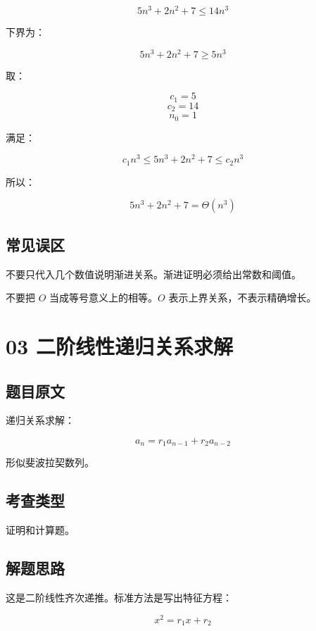 \documentclass[UTF8,zihao=-4]{ctexart}
\begin{document}
\[5n^{3} + 2n^{2} + 7 \le  14n^{3}\]

下界为：

\[5n^{3} + 2n^{2} + 7 \ge  5n^{3}\]

取：

\[c_{1} = 5\]
\[c_{2} = 14\]
\[n_{0} = 1\]

满足：

\[c_{1} n^{3} \le  5n^{3} + 2n^{2} + 7 \le  c_{2} n^{3}\]

所以：

\[5n^{3} + 2n^{2} + 7 = \Theta(n^{3})\]

\subsection*{常见误区}

不要只代入几个数值说明渐进关系。渐进证明必须给出常数和阈值。

不要把 $O$ 当成等号意义上的相等。$O$ 表示上界关系，不表示精确增长。

\newpage

\section*{03 二阶线性递归关系求解}

\subsection*{题目原文}

递归关系求解：

\[a_{n} = r_{1} a_{n-1} + r_{2} a_{n-2}\]

形似斐波拉契数列。

\subsection*{考查类型}

证明和计算题。

\subsection*{解题思路}

这是二阶线性齐次递推。标准方法是写出特征方程：

\[x^{2} = r_{1} x + r_{2}\]
\end{document}
